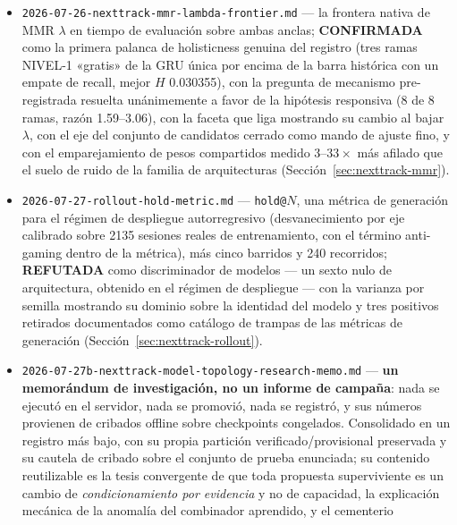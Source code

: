 \documentclass[11pt]{article}
\begin{document}
\begin{itemize}
    ${\sim}0.8\sigma$, ReLU en ${\sim}5.9\sigma$, \texttt{frac\_exact\_zero} $=$
    \texttt{frac\_negative\_coords} $=$ \num{0.5327}), más el análisis de potencia
    medido y las tres generaciones de holisticidad
    (Secciones~\ref{sec:nexttrack-preencoder} y~\ref{sec:nexttrack-power}).
  \item \texttt{2026-07-26-nexttrack-mmr-lambda-frontier.md} --- la frontera
    nativa de MMR $\lambda$ en tiempo de evaluación sobre ambas anclas;
    \textbf{CONFIRMADA} como la primera palanca de holisticness genuina del
    registro (tres ramas NIVEL-1 «gratis» de la GRU única por encima de la barra
    histórica con un empate de recall, mejor $H$ \num{0.030355}), con la pregunta
    de mecanismo pre-registrada resuelta unánimemente a favor de la hipótesis
    responsiva (8 de 8 ramas, razón \numrange{1.59}{3.06}), con la faceta que liga
    mostrando su cambio al bajar $\lambda$, con el eje del conjunto de candidatos
    cerrado como mando de ajuste fino, y con el emparejamiento de pesos compartidos
    medido $\numrange{3}{33}\times$ más afilado que el suelo de ruido de la familia
    de arquitecturas (Sección~\ref{sec:nexttrack-mmr}).
  \item \texttt{2026-07-27-rollout-hold-metric.md} --- \texttt{hold@}$N$, una
    métrica de generación para el régimen de despliegue autorregresivo
    (desvanecimiento por eje calibrado sobre \num{2135} sesiones reales de
    entrenamiento, con el término anti-gaming dentro de la métrica), más cinco
    barridos y \num{240} recorridos; \textbf{REFUTADA} como discriminador de
    modelos --- un sexto nulo de arquitectura, obtenido en el régimen de despliegue
    --- con la varianza por semilla mostrando su dominio sobre la identidad del
    modelo y tres positivos retirados documentados como catálogo de trampas de las
    métricas de generación (Sección~\ref{sec:nexttrack-rollout}).
  \item \texttt{2026-07-27b-nexttrack-model-topology-research-memo.md} ---
    \textbf{un memorándum de investigación, no un informe de campaña}: nada se
    ejecutó en el servidor, nada se promovió, nada se registró, y sus números
    provienen de cribados offline sobre checkpoints congelados. Consolidado en un
    registro más bajo, con su propia partición verificado/provisional preservada y
    su cautela de cribado sobre el conjunto de prueba enunciada; su contenido
    reutilizable es la tesis convergente de que toda propuesta superviviente es un
    cambio de \emph{condicionamiento por evidencia} y no de capacidad, la
    explicación mecánica de la anomalía del combinador aprendido, y el cementerio

\end{itemize}
\end{document}
